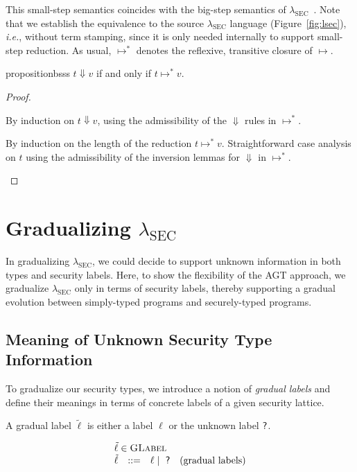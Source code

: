 \documentclass[authoryear,sort&compress,9pt,twocolumn,nocopyrightspace]{sigplanconf}
\newcommand{\oblset}[1]{\textsc{#1}}
\newcommand{\GLabel}{\oblset{GLabel}}
\newcommand{\lsec}{$\lambda_\text{SEC}$\xspace}
\newcommand{\?}{\textsf{\upshape ?}} \newcommand{\consistent}[1]{\widetilde{#1}}
\newcommand{\collecting}[1]{\wideparen{#1}}
\newcommand{\lx}{\ell} \newcommand{\ul}{\?}\newcommand{\clx}{{\tilde{\lx}}} \newcommand{\cll}{\collecting{\lx}} \newcommand{\cS}{{\consistent{S}}} \newcommand{\clS}{\collecting{S}}\newcommand{\subl}{\preccurlyeq}\newcommand{\csubl}{\;\consistent{\subl}\;}
\newcommand{\red}{\longmapsto}
\newcommand{\ie}{\emph{i.e.}\xspace}
\begin{document}
This small-step semantics coincides with the big-step semantics of
\lsec~\cite{zdancewic}. Note that we establish the equivalence to the source
\lsec language (Figure~\ref{fig:lsec}), \ie, without term stamping, since it is
only needed internally to support small-step reduction.
As usual, $\red^{*}$ denotes the reflexive, transitive closure of $\red$.

\begin{restatable}[]{proposition}{bsss}
$t \Downarrow v$ if and only if $t \red^{*} v$.
\end{restatable}
\begin{proof}
  \mbox{}
  \begin{case}[only if]
    By induction on $t \Downarrow v$, using the
    admissibility of the
    $\Downarrow$ rules in $\red^{*}$.\\
  \end{case}

  \begin{case}[if]
    By induction on the length of the reduction $t \red^{*} v$. Straightforward
    case analysis on $t$ using the admissibility of the inversion lemmas for
    $\Downarrow$ in $\red^{*}$.
  \end{case}
\end{proof}


\section{Gradualizing \lsec}
\label{sec:gradualizing-lsec-1}

In gradualizing \lsec, we could decide to support unknown information in both
types and security labels. Here, to show the flexibility of the AGT approach,
we gradualize \lsec only in terms of security labels, thereby supporting a
gradual evolution between simply-typed programs and securely-typed programs.

\subsection{Meaning of Unknown Security Type Information}
\label{ssec:sec-meaning}

To gradualize our security types, we introduce a notion of \emph{gradual
  labels} and define their meanings in terms of concrete labels of a given
security lattice.

\begin{definition}
A gradual label $\clx$ is either a label $\lx$ or the unknown label $\ul$.
\end{definition}
\begin{displaymath}
\begin{array}{rcll}
\multicolumn{4}{l}{\clx \in \GLabel}\\
  \clx & ::= & \lx \;|\; \ul & \text{(gradual labels)}
\end{array}
\end{displaymath}
\end{document}

